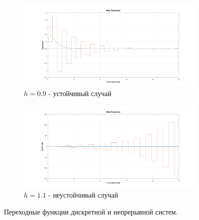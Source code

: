 \documentclass[12pt]{article}
\begin{document}
\begin{figure}[H]
    \centering
    \begin{subfigure}{0.49\textwidth}
        \centering
        \includegraphics[width=\textwidth]{3_low_h.png}
        \caption{$h = 0.9$ - устойчивый случай}
         \label{fig:3_low_h.png}
     \end{subfigure}
     \hfill
     \begin{subfigure}{0.49\textwidth}
         \centering
         \includegraphics[width=\textwidth]{3_high_h.png}
         \caption{$h = 1.1$ - неустойчивый случай}
         \label{fig:3_high_h.png}
     \end{subfigure}
    \caption{Переходные функции дискретной и непрерывной систем.}
    \label{fig:two graphs}
\end{figure}
\end{document}
